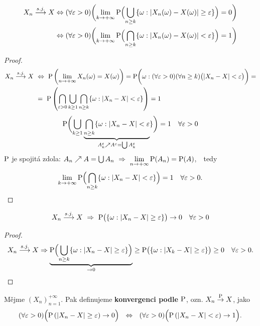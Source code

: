 \begin{theorem}
	\[
	\begin{split}
	X_n\stackrel{s.j.}{\longrightarrow} X&\Leftrightarrow(\forall\varepsilon>0)\biggl( \lim\limits_{ k\to +\infty} \mathrm{P}\Bigl( \bigcup\limits_{n\geq k}\{\omega:\left| X_n(\omega)-X(\omega) \right|\geq \varepsilon\} \Bigr)=0\biggr) \\
	&\Leftrightarrow(\forall\varepsilon>0)\biggl( \lim\limits_{ k\to +\infty} \mathrm{P}\Bigl( \bigcap\limits_{n\geq k}\{\omega:\left| X_n(\omega)-X(\omega) \right|< \varepsilon\} \Bigr)=1\biggr)
	\end{split}
	\]
	\begin{proof}
		\[
		\begin{split}
		X_n\stackrel{s.j.}{\longrightarrow} X~&\Leftrightarrow~\mathrm{P}\left( \lim\limits_{ n\to +\infty}X_n(\omega)=X(\omega) \right)=\mathrm{P}\biggl( \omega: (\forall\varepsilon>0)(\forall n\geq k)\bigl(|X_n-X|<\varepsilon\bigr) \biggr) = \\
		&=~\mathrm{P}\left( \bigcap\limits_{\varepsilon>0}\bigcup\limits_{k\geq 1}\bigcap\limits_{n\geq k}\{ \omega: |X_n-X|<\varepsilon \} \right)=1
		\end{split}
		\] 
		$$ \mathrm{P}\biggl(\bigcup\limits_{k\geq 1}\underbrace{ \bigcap\limits_{n\geq k}\{ \omega: |X_n-X|<\varepsilon}_{A_k^\varepsilon\nearrow A^\varepsilon=\bigcup A_k^\varepsilon} \} \biggr)=1 ~~~\forall\varepsilon>0$$
		$\mathrm{P}$ je spojitá zdola: $ A_n\nearrow A=\bigcup A_n ~\Rightarrow~\lim\limits_{ n\to +\infty}\mathrm{P}(A_n)=\mathrm{P}(A) $,~~tedy
		$$\lim\limits_{ k\to +\infty}\mathrm{P}\Bigl( \bigcap\limits_{n\geq k}\{\omega: |X_n-X|<\varepsilon \} \Bigr)=1~~~\forall\varepsilon>0.$$
		
	\end{proof}
\end{theorem}
\begin{dusl}
	$$ X_n\stackrel{s.j.}{\longrightarrow} X~\Rightarrow~ \mathrm{P}\bigl( \{\omega: |X_n-X|\geq\varepsilon \} \bigr)\to 0~~~\forall\varepsilon>0 $$\begin{proof}
		$$ X_n\stackrel{s.j.}{\longrightarrow} X \Rightarrow \underbrace{\mathrm{P}\Bigl( \bigcup\limits_{n\geq k}\{\omega: |X_n-X|\geq\varepsilon \} \Bigr)}_{\to0}\geq \mathrm{P}\bigl( \{\omega: |X_k-X|\geq \varepsilon \} \bigr)\geq 0~~~\forall\varepsilon>0. $$
	\end{proof}
\end{dusl}
\begin{define}
	Mějme $(X_n)_{n=1}^{+\infty}$. Pak definujeme \textbf{konvergenci podle $\mathrm{P}$}, ozn. $X_n\stackrel{\mathrm{P}}{\to}X$, jako 
$$
	(\forall\varepsilon>0)\Bigl(\mathrm{P}\left( |X_n-X|\geq \varepsilon \right)\to0\Bigr)~~\Leftrightarrow~~(\forall\varepsilon>0)\Bigl(\mathrm{P}\left( |X_n-X|< \varepsilon \right)\to1\Bigr).
$$
\end{define}
